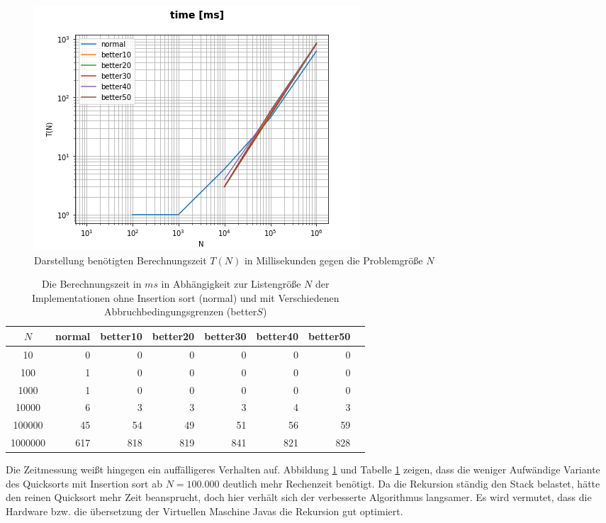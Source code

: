 \documentclass[
   draft=false
  ,paper=a4
  ,twoside=false
  ,fontsize=11pt
  ,headsepline
  ,DIV=11
  ,parskip=full+
  ,titlepage
]{scrartcl} %
\begin{document}
\begin{figure}[htp]
  \centering
  \includegraphics[width=\textwidth]{../time_ms.png}
  \caption[Zeit]{Darstellung benötigten Berechnungszeit $T(N)$ in
   Millisekunden gegen die Problemgröße $N$}
  \label{fig:time}
\end{figure}

\begin{table}[htp]
  \centering
  \caption[Bewegungen]{Die Berechnungszeit in $ms$ in Abhängigkeit 
  zur Listengröße $N$ der Implementationen ohne Insertion sort (normal) und
  mit Verschiedenen Abbruchbedingungsgrenzen (better$S$)}
  \label{tab:time}
  \begin{tabular}{|c|r|r|r|r|r|r|r|}
  \hline
  $N$ & normal & better10 & better20 & better30 & better40 & better50 \\
  \hline
  10 & 0 & 0 & 0 & 0 & 0 & 0 \\
100 & 1 & 0 & 0 & 0 & 0 & 0 \\
1000 & 1 & 0 & 0 & 0 & 0 & 0 \\
10000 & 6 & 3 & 3 & 3 & 4 & 3 \\
100000 & 45 & 54 & 49 & 51 & 56 & 59 \\
1000000 & 617 & 818 & 819 & 841 & 821 & 828 \\
\hline
  \end{tabular}
\end{table}

Die Zeitmessung weißt hingegen ein auffälligeres Verhalten auf. Abbildung \ref{fig:time} und Tabelle \ref{tab:time} zeigen, dass die weniger Aufwändige Variante des Quicksorts mit Insertion sort ab $N = 100.000$ deutlich mehr Rechenzeit benötigt. Da die Rekursion ständig den Stack belastet, hätte den 
reinen Quicksort mehr Zeit beansprucht, doch hier verhält sich der verbesserte
Algorithmus langsamer. Es wird vermutet, dass die Hardware bzw. die übersetzung der Virtuellen Maschine Javas die Rekursion gut optimiert.
\end{document}
